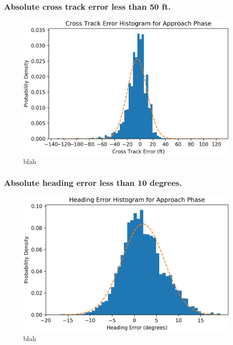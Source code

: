         
    	\subsubsection{Absolute cross track error less than 50 ft.}
        
            \begin{figure}
                \centering
                \includegraphics[width=\linewidth]{img/cross_track_hist}
                \caption{blah}
                \label{fig:approach_cross_track_hist}
            \end{figure}
            
            
    	\subsubsection{Absolute heading error less than 10 degrees.}
        
            \begin{figure}
                \centering
                \includegraphics[width=\linewidth]{img/heading_hist}
                \caption{blah}
                \label{fig:approach_heading_hist}
            \end{figure}
    
